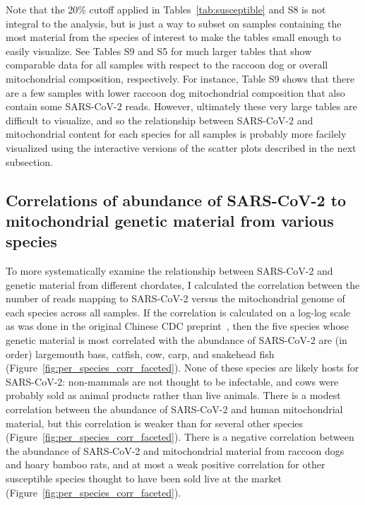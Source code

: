 \documentclass[9pt,twocolumn,twoside]{gsajnl_modified}
\begin{document}
Note that the 20\% cutoff applied in Tables~\ref{tab:susceptible} and S8 is not integral to the analysis, but is just a way to subset on samples containing the most material from the species of interest to make the tables small enough to easily visualize.
See Tables S9 and S5 for much larger tables that show comparable data for all samples with respect to the raccoon dog or overall mitochondrial composition, respectively.
For instance, Table S9 shows that there are a few samples with lower raccoon dog mitochondrial composition that also contain some SARS-CoV-2 reads.
However, ultimately these very large tables are difficult to visualize, and so the relationship between SARS-CoV-2 and mitochondrial content for each species for all samples is probably more facilely visualized using the interactive versions of the scatter plots described in the next subsection.

\subsection{Correlations of abundance of SARS-CoV-2 to mitochondrial genetic material from various species}
To more systematically examine the relationship between SARS-CoV-2 and genetic material from different chordates, I calculated the correlation between the number of reads mapping to SARS-CoV-2 versus the mitochondrial genome of each species across all samples.
If the correlation is calculated on a log-log scale as was done in the original Chinese CDC preprint~\citep{liu2022surveillance}, then the five species whose genetic material is most correlated with the abundance of SARS-CoV-2 are (in order) largemouth bass, catfish, cow, carp, and snakehead fish (Figure~\ref{fig:per_species_corr_faceted}).
None of these species are likely hosts for SARS-CoV-2: non-mammals are not thought to be infectable, and cows were probably sold as animal products rather than live animals.
There is a modest correlation between the abundance of SARS-CoV-2 and human mitochondrial material, but this correlation is weaker than for several other species (Figure~\ref{fig:per_species_corr_faceted}).
There is a negative correlation between the abundance of SARS-CoV-2 and mitochondrial material from raccoon dogs and hoary bamboo rats, and at most a weak positive correlation for other susceptible species thought to have been sold live at the market (Figure~\ref{fig:per_species_corr_faceted}).
\end{document}
